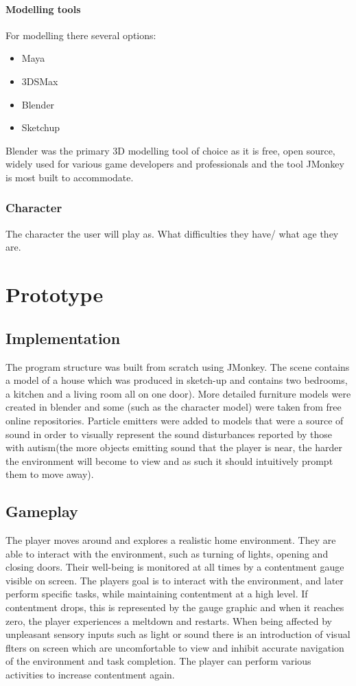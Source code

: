 \documentclass[11pt]{report}
\begin{document}
\subsubsection{Modelling tools}
For modelling there several options:
\begin{itemize}
\item Maya
\item 3DSMax
\item Blender
\item Sketchup
\end{itemize}

Blender was the primary 3D modelling tool of choice as it is free, open source, widely used for various game developers and professionals and the tool JMonkey is most built to accommodate.


\subsection{Character}
The character the user will play as. What difficulties they have/ what age they are.


\chapter{Prototype}

\section{Implementation}
The program structure was built from scratch using JMonkey. The scene contains a model of a house which was produced in sketch-up and contains two bedrooms, a kitchen and a living room all on one door). More detailed furniture models were created in blender and some (such as the character model) were taken from free online repositories. Particle emitters were added to models that were a source of sound in order to visually represent the sound disturbances reported by those with autism(the more objects emitting sound that the player is near, the harder the environment will become to view and as such it should intuitively prompt them to move away).

\section{Gameplay}
The player moves around and explores a realistic home environment. They are able to interact with the environment, such as turning of lights, opening and closing doors. Their well-being is monitored at all times by a contentment gauge visible on screen. The players goal is to interact with the environment, and later perform specific tasks, while
maintaining contentment at a high level. If contentment drops, this is represented by the gauge graphic and when it reaches zero, the player experiences a meltdown and restarts. When being affected by unpleasant sensory inputs
such as light or sound there is an introduction of visual flters on screen which are uncomfortable to view and inhibit accurate navigation of the environment and task completion. The player can perform various activities to increase contentment again.
\end{document}
